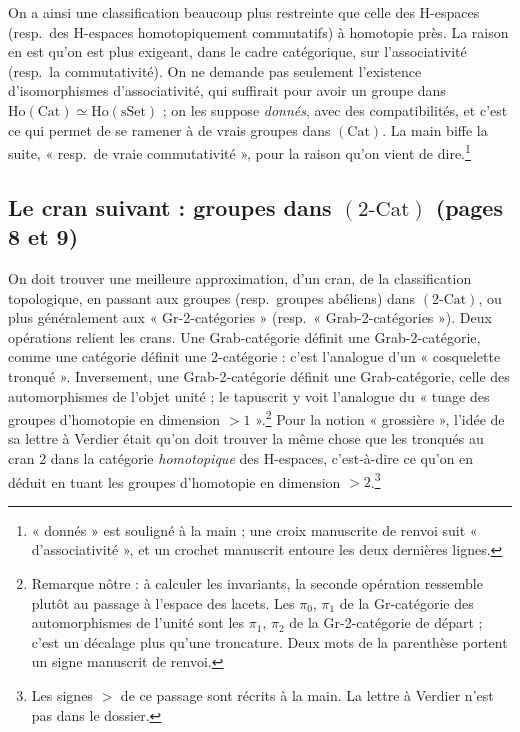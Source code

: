 \documentclass[11pt,a4paper]{article}
\begin{document}
On a ainsi une classification beaucoup plus restreinte que celle des H-espaces
(resp.\ des H-espaces homotopiquement commutatifs) à homotopie près. La raison
en est qu'on est plus exigeant, dans le cadre catégorique, sur l'associativité
(resp.\ la commutativité). On ne demande pas seulement l'existence
d'isomorphismes d'associativité, qui suffirait pour avoir un groupe dans
$\mathrm{Ho}(\mathrm{Cat}) \simeq \mathrm{Ho}(\mathrm{sSet})$ ; on les suppose
\emph{donnés}, avec des compatibilités, et c'est ce qui permet de se ramener à
de vrais groupes dans $(\mathrm{Cat})$. La main biffe la suite, « resp.\ de
vraie commutativité », pour la raison qu'on vient de dire.\footnote{« donnés »
est souligné à la main ; une croix manuscrite de renvoi suit
« d'associativité », et un crochet manuscrit entoure les deux dernières lignes.}

\subsection*{Le cran suivant : groupes dans $(2\text{-Cat})$ (pages 8 et 9)}

On doit trouver une meilleure approximation, d'un cran, de la classification
topologique, en passant aux groupes (resp.\ groupes abéliens) dans
$(2\text{-Cat})$, ou plus généralement aux « Gr-2-catégories » (resp.\
« Grab-2-catégories »). Deux opérations relient les crans. Une Grab-catégorie
définit une Grab-2-catégorie, comme une catégorie définit une 2-catégorie :
c'est l'analogue d'un « cosquelette tronqué ». Inversement, une
Grab-2-catégorie définit une Grab-catégorie, celle des automorphismes de
l'objet unité ; le tapuscrit y voit l'analogue du « tuage des groupes
d'homotopie en dimension $> 1$ ».\footnote{Remarque nôtre : à calculer les
invariants, la seconde opération ressemble plutôt au passage à l'espace des
lacets. Les $\pi_0$, $\pi_1$ de la Gr-catégorie des automorphismes de l'unité
sont les $\pi_1$, $\pi_2$ de la Gr-2-catégorie de départ ; c'est un décalage
plus qu'une troncature. Deux mots de la parenthèse portent un signe manuscrit
de renvoi.} Pour la notion « grossière », l'idée de sa lettre à Verdier était
qu'on doit trouver la même chose que les tronqués au cran 2 dans la catégorie
\emph{homotopique} des H-espaces, c'est-à-dire ce qu'on en déduit en tuant les
groupes d'homotopie en dimension $> 2$.\footnote{Les signes $>$ de ce passage
sont récrits à la main. La lettre à Verdier n'est pas dans le dossier.}
\end{document}
